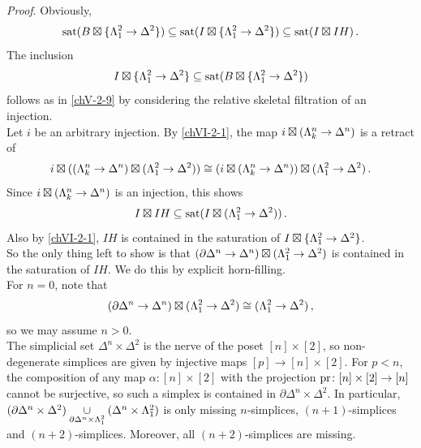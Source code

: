         \emph{Proof}. Obviously,
        \begin{equation*}
            \operatorname{sat}(B \boxtimes \{ \Lambda^{2}_{1} \to \Delta^2 \}) \subseteq \operatorname{sat}(I \boxtimes \{ \Lambda^{2}_{1} \to \Delta^2 \}) \subseteq \operatorname{sat}(I \boxtimes I H) \,.
        \end{equation*}
        The inclusion
        \begin{equation*}
            I \boxtimes \{ \Lambda^{2}_{1} \to \Delta^2 \} \subseteq \operatorname{sat}(B \boxtimes \{ \Lambda^{2}_{1} \to \Delta^2 \})
        \end{equation*}
        follows as in \ref{chV-2-9} by considering the relative skeletal filtration of an injection.\\
        Let $i$ be an arbitrary injection. By \ref{chVI-2-1}, the map $i \boxtimes (\Lambda^{n}_{k} \to \Delta^n)$ is a retract of
        \begin{equation*}
            i \boxtimes ((\Lambda^{n}_{k} \to \Delta^n) \boxtimes (\Lambda^{2}_{1} \to \Delta^2)) \cong (i \boxtimes (\Lambda^{n}_{k} \to \Delta^n)) \boxtimes (\Lambda^{2}_{1} \to \Delta^2) \,.
        \end{equation*}
        Since $i \boxtimes (\Lambda^{n}_{k} \to \Delta^n)$ is an injection, this shows
        \begin{equation*}
            I \boxtimes I H \subseteq \operatorname{sat}(I \boxtimes (\Lambda^{2}_{1} \to \Delta^2)) \,.
        \end{equation*}
        Also by \ref{chVI-2-1}, $I H$ is contained in the saturation of $I \boxtimes \{\Lambda^{2}_{1} \to \Delta^2\}$.\\
        So the only thing left to show is that $(\partial \Delta^n \to \Delta^n) \boxtimes (\Lambda^{2}_{1} \to \Delta^2)$ is contained in the saturation of $I H$. We do this by explicit horn-filling.\\
        For $n = 0$, note that
        \begin{equation*}
            (\partial \Delta^n \to \Delta^n) \boxtimes (\Lambda^{2}_{1} \to \Delta^2) \cong (\Lambda^{2}_{1} \to \Delta^2) \,,
        \end{equation*}
        so we may assume $n > 0$.\\
        The simplicial set $\Delta^n \times \Delta^2$ is the nerve of the poset $[n] \times [2]$, so non-degenerate simplices are given by injective maps $[p] \to [n] \times [2]$. For $p < n$, the composition of any map $\alpha \colon [n] \times [2]$ with the projection $\operatorname{pr} \colon [n] \times [2] \to [n]$ cannot be surjective, so such a simplex is contained in $\partial \Delta^n \times \Delta^2$. In particular, $(\partial \Delta^n \times \Delta^2) \underset{\partial \Delta^n \times \Lambda^{2}_{1}}{\cup} (\Delta^n \times \Lambda^{2}_{1})$ is only missing $n$-simplices, $(n+1)$-simplices and $(n+2)$-simplices. Moreover, all $(n+2)$-simplices are missing.\\
